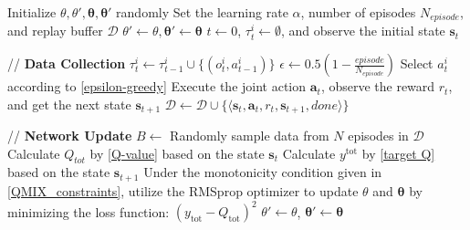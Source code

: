 \begin{algorithm}[t]
    \caption{MBA-RL charging control framework}
    \label{alg:QMIX}

    \begin{algorithmic}[1]
        \STATE Initialize $\theta, \theta', \bm{\theta}, \bm{\theta}'$ randomly
        \STATE Set the learning rate $\alpha$, number of episodes $N_{episode}$, and replay buffer $\mathcal{D}$
        \STATE $\theta' \leftarrow \theta, \bm{\theta}' \leftarrow \bm{\theta}$
            \STATE $t\leftarrow 0$, $\tau_t^i \leftarrow \emptyset$, and observe the initial state $\mathbf{s}_t$

            // \textbf{Data Collection}
                    \STATE $\tau_t^i \leftarrow \tau_{t-1}^i \cup \{(o_t^i, a_{t-1}^i)\}$
                    \STATE $\epsilon \gets 0.5 (1 - \frac{episode}{N_{episode}})$
                    \STATE Select $a_t^i$ according to \eqref{epsilon-greedy}
                \ENDFOR
                \STATE Execute the joint action $\mathbf{a}_t$, observe the reward $r_t$, and get the next state $\mathbf{s}_{t+1}$
                \STATE $\mathcal{D} \leftarrow \mathcal{D} \cup \{ \langle\mathbf{s}_t, \mathbf{a}_t, r_t, \mathbf{s}_{t+1}, done\rangle \}$
            \ENDWHILE

            // \textbf{Network Update}
                \STATE $B \leftarrow$ Randomly sample data from $N$ episodes in $\mathcal{D}$
                    \STATE Calculate $Q_{tot}$ by \eqref{Q-value} based on the state $\mathbf{s}_t$
                    \STATE Calculate $y^{\text{tot}}$ by \eqref{target Q} based on the state $\mathbf{s}_{t+1}$
                \ENDFOR
                \STATE Under the monotonicity condition given in \eqref{QMIX_constraints}, utilize the RMSprop  optimizer \cite{zou2019sufficient} to update $\theta$ and $\bm{\theta}$ by minimizing the loss function: $\left( y_{\text{tot}} - Q_{\text{tot}} \right)^2$
            \ENDIF
                \STATE $\theta' \leftarrow \theta$, $\bm{\theta}' \leftarrow \bm{\theta}$
            \ENDIF
        \ENDFOR
    \end{algorithmic}
\end{algorithm}
